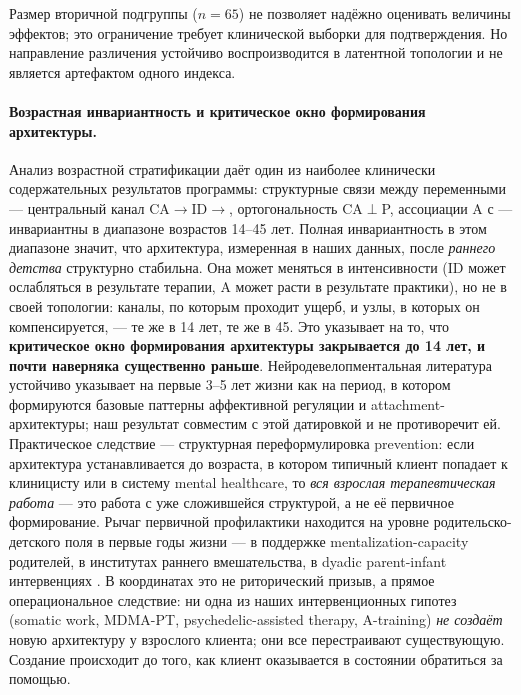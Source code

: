 Размер вторичной подгруппы ($n = 65$) не позволяет надёжно оценивать величины эффектов; это ограничение требует клинической выборки для подтверждения. Но направление различения устойчиво воспроизводится в латентной топологии и не является артефактом одного индекса.

\paragraph{Возрастная инвариантность и критическое окно формирования архитектуры.} Анализ возрастной стратификации даёт один из наиболее клинически содержательных результатов программы: структурные связи между переменными --- центральный канал CA$\to$ID$\to$\EAF{}, ортогональность CA$\perp$P, ассоциации A с \EAF{} --- инвариантны в диапазоне возрастов 14--45 лет. Полная инвариантность в этом диапазоне значит, что архитектура, измеренная в наших данных, после \emph{раннего детства} структурно стабильна. Она может меняться в интенсивности (ID может ослабляться в результате терапии, A может расти в результате практики), но не в своей топологии: каналы, по которым проходит ущерб, и узлы, в которых он компенсируется, --- те же в 14 лет, те же в 45. Это указывает на то, что \textbf{критическое окно формирования архитектуры закрывается до 14 лет, и почти наверняка существенно раньше}. Нейродевелопментальная литература \citep{schore2001, perry2002, siegel2012} устойчиво указывает на первые 3--5 лет жизни как на период, в котором формируются базовые паттерны аффективной регуляции и attachment-архитектуры; наш результат совместим с этой датировкой и не противоречит ей. Практическое следствие --- структурная переформулировка prevention: если архитектура устанавливается до возраста, в котором типичный клиент попадает к клиницисту или в систему mental healthcare, то \emph{вся взрослая терапевтическая работа} --- это работа с уже сложившейся структурой, а не её первичное формирование. Рычаг первичной профилактики находится на уровне родительско-детского поля в первые годы жизни --- в поддержке mentalization-capacity родителей, в институтах раннего вмешательства, в dyadic parent-infant интервенциях \citep{powell2013}. В координатах \DEIC{} это не риторический призыв, а прямое операциональное следствие: ни одна из наших интервенционных гипотез (somatic work, MDMA-PT, psychedelic-assisted therapy, A-training) \emph{не создаёт} новую архитектуру у взрослого клиента; они все перестраивают существующую. Создание происходит до того, как клиент оказывается в состоянии обратиться за помощью.

